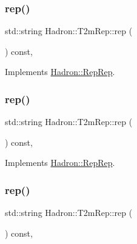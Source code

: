 \subsubsection{\texorpdfstring{rep()}{rep()}\hspace{0.1cm}{\footnotesize\ttfamily [1/3]}}
{\footnotesize\ttfamily std\+::string Hadron\+::\+T2m\+Rep\+::rep (\begin{DoxyParamCaption}{ }\end{DoxyParamCaption}) const\hspace{0.3cm}{\ttfamily [inline]}, {\ttfamily [virtual]}}



Implements \mbox{\hyperlink{structHadron_1_1RepRep_ab3213025f6de249f7095892109575fde}{Hadron\+::\+Rep\+Rep}}.

\mbox{\label{structHadron_1_1T2mRep_a7b3ba7f0e39ae3d4f8f377ab928fafee}} 
\subsubsection{\texorpdfstring{rep()}{rep()}\hspace{0.1cm}{\footnotesize\ttfamily [2/3]}}
{\footnotesize\ttfamily std\+::string Hadron\+::\+T2m\+Rep\+::rep (\begin{DoxyParamCaption}{ }\end{DoxyParamCaption}) const\hspace{0.3cm}{\ttfamily [inline]}, {\ttfamily [virtual]}}



Implements \mbox{\hyperlink{structHadron_1_1RepRep_ab3213025f6de249f7095892109575fde}{Hadron\+::\+Rep\+Rep}}.

\mbox{\label{structHadron_1_1T2mRep_a7b3ba7f0e39ae3d4f8f377ab928fafee}} 
\subsubsection{\texorpdfstring{rep()}{rep()}\hspace{0.1cm}{\footnotesize\ttfamily [3/3]}}
{\footnotesize\ttfamily std\+::string Hadron\+::\+T2m\+Rep\+::rep (\begin{DoxyParamCaption}{ }\end{DoxyParamCaption}) const\hspace{0.3cm}{\ttfamily [inline]}, {\ttfamily [virtual]}}



